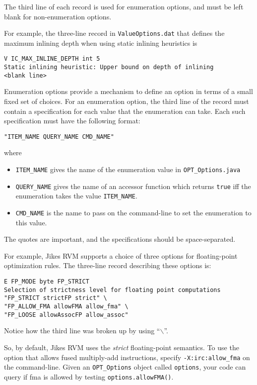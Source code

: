 The third line of each record is used for enumeration options, and must
be left blank for non-enumeration options.

For example, the three-line record in {\tt ValueOptions.dat}
that defines the maximum inlining depth when using static inlining
heuristics is
\begin{verbatim}
V IC_MAX_INLINE_DEPTH int 5
Static inlining heuristic: Upper bound on depth of inlining
<blank line>
\end{verbatim}

Enumeration options provide a mechanism to define an option in terms of 
a small fixed set of choices.  For an enumeration option, the third line
of the record must contain a specification for each value that the
enumeration can take.  Each such specification must have the following
format:
\begin{verbatim}
"ITEM_NAME QUERY_NAME CMD_NAME"
\end{verbatim}
where
\begin{itemize}
\item {\tt ITEM\_NAME} gives the name of the enumeration value in {\tt OPT\_Options.java}
\item {\tt QUERY\_NAME} gives the name of an accessor function which returns {\tt true} iff the enumeration takes the value {\tt ITEM\_NAME}.
\item {\tt CMD\_NAME} is the name to pass on the command-line to set the enumeration to this value.
\end{itemize}
The quotes are important, and the specifications should be
space-separated.

For example, Jikes RVM supports a choice of three options for floating-point
optimization rules.  The three-line record describing these options is:
\begin{verbatim}
E FP_MODE byte FP_STRICT
Selection of strictness level for floating point computations
"FP_STRICT strictFP strict" \
"FP_ALLOW_FMA allowFMA allow_fma" \
"FP_LOOSE allowAssocFP allow_assoc"
\end{verbatim}
Notice how the third line was broken up by using ``$\backslash$''.

So, by default, Jikes RVM uses the {\em strict} floating-point
semantics.  To use 
the option that allows fused multiply-add instructions, 
specify {\tt -X:irc:allow\_fma} on the command-line.
Given an {\tt OPT\_Options} object called {\tt options}, your code can
query if fma is allowed by testing {\tt options.allowFMA()}.

